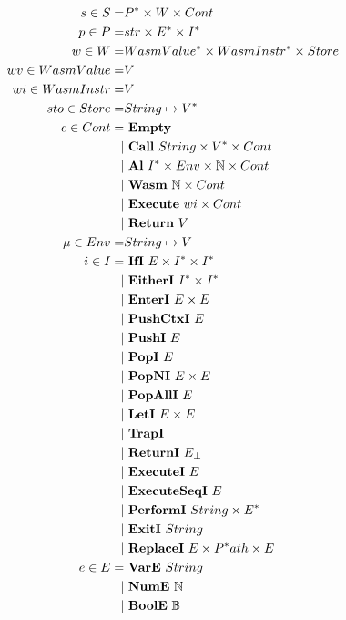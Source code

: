 \begin{align*}
%
  s \in S =& \seq P \times W \times Cont \\
%
  p \in P =& str \times \seq E \times \seq I \\
%
  w \in W =& \seq{WasmValue} \times \seq{WasmInstr} \times Store \\
  wv \in WasmValue =& V \\
  wi \in WasmInstr =& V \\
%
  sto \in Store =& String \mapsto \seq V \\
%
  c \in Cont =& ~ \mt \\
    | & ~ \call ~ String \times \seq V \times Cont \\
    | & ~ \al ~ \seq I \times Env \times \mathbb N \times Cont \\
    | & ~ \wasm ~ \mathbb N \times Cont \\
    | & ~ \exe ~ wi \times Cont \\
    | & ~ \ret ~ V \\
%
  \mu \in Env =& String \mapsto V \\
%
  i \in I =& ~ \ifi ~ E \times \seq I \times \seq I \\
    | & ~ \eitheri ~ \seq I \times \seq I \\
    | & ~ \enteri ~ E \times E \\
    | & ~ \pushctxi ~ E \\
    | & ~ \pushi ~ E \\
    | & ~ \popi ~ E \\
    | & ~ \popni ~ E \times E \\
    | & ~ \popalli ~ E \\
    | & ~ \leti ~ E \times E \\
    | & ~ \trapi \\
    | & ~ \returni ~ E_{\bot} \\
    | & ~ \executei ~ E \\
    | & ~ \executeseqi ~ E \\
    | & ~ \performi ~ String \times \seq{E} \\
    | & ~ \exiti ~ String \\
    | & ~ \replacei ~ E \times \seq Path \times E \\
%
  e \in E =& ~ \vare ~ String \\
    | & ~ \nume ~ \mathbb N \\
    | & ~ \boole ~ \mathbb B \\

\end{align*}
